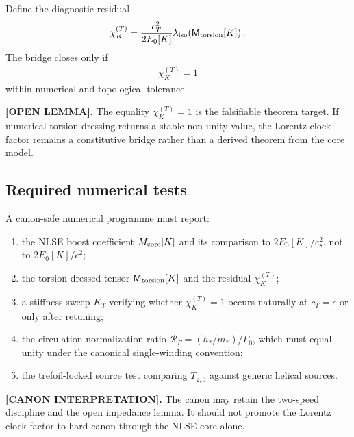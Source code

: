 Define the diagnostic residual
\begin{align}
    \chi_K^{(T)}
    =
    \frac{c_T^2}{2E_0[K]}
    \lambda_{\rm iso}\!\left(\mathsf M_{\rm torsion}[K]\right).
\end{align}
The bridge closes only if
\begin{align}
    \chi_K^{(T)}=1
\end{align}
within numerical and topological tolerance.

\textbf{[OPEN LEMMA].}
The equality \(\chi_K^{(T)}=1\) is the falsifiable theorem target. If numerical torsion-dressing returns a stable non-unity value, the Lorentz clock factor remains a constitutive bridge rather than a derived theorem from the core model.

\subsection{Required numerical tests}

A canon-safe numerical programme must report:
\begin{enumerate}
    \item the NLSE boost coefficient \(M_{\rm core}[K]\) and its comparison to \(2E_0[K]/c_s^2\), not to \(2E_0[K]/c^2\);
    \item the torsion-dressed tensor \(\mathsf M_{\rm torsion}[K]\) and the residual \(\chi_K^{(T)}\);
    \item a stiffness sweep \(K_T\) verifying whether \(\chi_K^{(T)}=1\) occurs naturally at \(c_T=c\) or only after retuning;
    \item the circulation-normalization ratio \(\mathcal R_\Gamma=(h_*/m_*)/\Gamma_0\), which must equal unity under the canonical single-winding convention;
    \item the trefoil-locked source test comparing \(T_{2,3}\) against generic helical sources.
\end{enumerate}

\textbf{[CANON INTERPRETATION].}
The canon may retain the two-speed discipline and the open impedance lemma. It should not promote the Lorentz clock factor to hard canon through the NLSE core alone.
